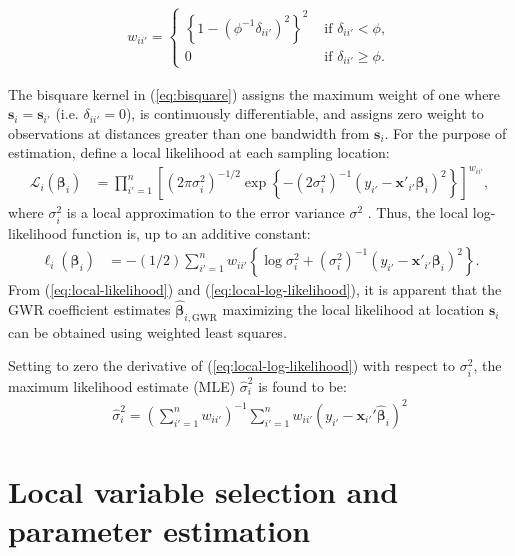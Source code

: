 \documentclass[authoryear, review, 11pt]{elsarticle}
\begin{document}
	\begin{align}\label{eq:bisquare}
		w_{ii'} = \begin{cases} \left\{1-\left(\phi^{-1}\delta_{ii'}\right)^2\right\}^2 &\mbox{ if } \delta_{ii'} < \phi, \\ 0 &\mbox{ if } \delta_{ii'} \geq \phi. \end{cases}
	\end{align}
	
	The bisquare kernel in (\ref{eq:bisquare}) assigns the maximum weight of one where $\bm{s}_i = \bm{s}_{i'}$ (i.e. $\delta_{ii'}=0$), is continuously differentiable, and assigns zero weight to observations at distances greater than one bandwidth from $\bm{s}_i$. For the purpose of estimation, define a local likelihood at each sampling location:
	\begin{align}\label{eq:local-likelihood}
		\mathcal{L}_i \left(\bm{\beta}_i \right) &= \prod_{i'=1}^n \left[ \left(2 \pi \sigma^2_i  \right)^{-1/2}  \exp\left\{-\left(2 \sigma^2_i\right)^{-1}  \left(y_{i'} - \bm{x}'_{i'} \bm{\beta}_i \right)^2 \right\} \right] ^ {w_{ii'}},
	\end{align}			
	where $\sigma_i^2$ is a local approximation to the error variance $\sigma^2$ \citep{Fotheringham:2002}. Thus, the local log-likelihood function is, up to an additive constant:
	\begin{align}\label{eq:local-log-likelihood}
		\ell_i\left(\bm{\beta}_i\right) &= -(1/2) \sum_{i'=1}^n w_{ii'} \left\{ \log{\sigma^2_i}  + \left(\sigma^2_i\right)^{-1}  \left(y_{i'} - \bm{x}'_{i'} \bm{\beta}_i \right)^2 \right\}.
	\end{align}
	From (\ref{eq:local-likelihood}) and (\ref{eq:local-log-likelihood}), it is apparent that the GWR coefficient estimates $\hat{\bm{\beta}}_{i,\text{GWR}}$ maximizing the local likelihood at location $\bm{s}_i$ can be obtained using weighted least squares. 
	
	 Setting to zero the derivative of (\ref{eq:local-log-likelihood}) with respect to $\sigma_i^2$, the maximum likelihood estimate (MLE) $\hat{\sigma}_i^2$ is found to be:	 
	 \begin{align}
	 	\hat{\sigma}_i^2 = \left(\sum \limits_{i'=1}^{n} w_{ii'} \right)^{-1} \sum \limits_{i'=1}^n w_{ii'}\left(y_{i'} - \bm{x}_{i'}'\hat{\bm{\beta}}_i\right)^2
	\end{align}	
	 
	
\section{Local variable selection and parameter estimation \label{section:model-selection}}
\end{document}
